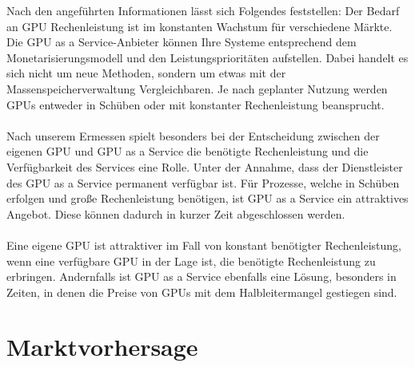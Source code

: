 \documentclass[12pt,toc=bib,toc=listof]{scrreprt}
\begin{document}
Nach den angeführten Informationen lässt sich Folgendes feststellen:  
Der Bedarf an GPU Rechenleistung ist im konstanten Wachstum für verschiedene Märkte. Die GPU as a Service-Anbieter 
können Ihre Systeme entsprechend dem Monetarisierungsmodell und den Leistungsprioritäten aufstellen. 
Dabei handelt es sich nicht um neue Methoden, sondern um etwas mit der Massenspeicherverwaltung Vergleichbaren. 
Je nach geplanter Nutzung werden GPUs entweder in Schüben oder mit konstanter Rechenleistung beansprucht.\\ \\
Nach unserem Ermessen spielt besonders bei der Entscheidung zwischen der eigenen GPU und GPU as a Service die 
benötigte Rechenleistung und die Verfügbarkeit des Services eine Rolle. Unter der Annahme, dass der Dienstleister des GPU as a Service permanent 
verfügbar ist. Für Prozesse, welche in Schüben erfolgen und große Rechenleistung benötigen, ist GPU as a Service ein attraktives Angebot.
Diese können dadurch in kurzer Zeit abgeschlossen werden.\\ \\
Eine eigene GPU ist attraktiver im Fall von konstant benötigter Rechenleistung, wenn eine verfügbare GPU in der Lage ist, 
die benötigte Rechenleistung zu erbringen. Andernfalls ist GPU as a Service ebenfalls eine Lösung, besonders in Zeiten,
in denen die Preise von GPUs mit dem Halbleitermangel gestiegen sind.

\chapter{Marktvorhersage}
\label{sec:Marktvorhersage}
\end{document}
